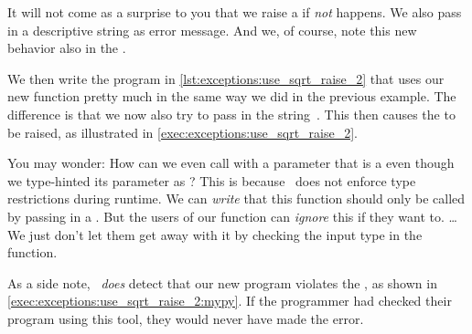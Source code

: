 It will not come as a surprise to you that we raise a  if \emph{not}  happens.
We also pass in a descriptive string as error message.
And we, of course, note this new behavior also in the .

We then write the program  in \cref{lst:exceptions:use_sqrt_raise_2} that uses our new  function pretty much in the same way we did in the previous example.
The difference is that we now also try to pass in the string~.
This then causes the  to be raised, as illustrated in \cref{exec:exceptions:use_sqrt_raise_2}.

You may wonder:
How can we even call  with a parameter that is a  even though we type-hinted its parameter as ?
This is because \python\ does not enforce type restrictions during runtime.
We can \emph{write} that this function should only be called by passing in a .
But the users of our function can \emph{ignore} this if they want to.
{\dots}We just don't let them get away with it by checking the input type in the function.

As a side note, \mypy\ \emph{does} detect that our new program  violates the , as shown in \cref{exec:exceptions:use_sqrt_raise_2:mypy}.
If the programmer had checked their program using this tool, they would never have made the error.

